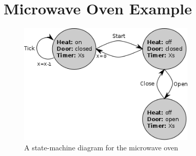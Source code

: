 \section{Microwave Oven Example}
\begin{figure}[!t]
\centering
\includegraphics[width=0.75\textwidth]{../images/microwave.png}
\caption{A state-machine diagram for the microwave oven}
\end{figure}